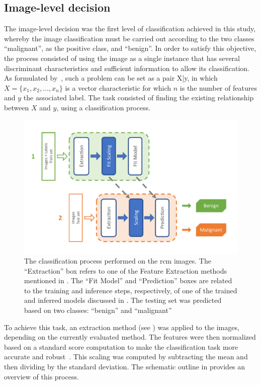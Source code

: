\documentclass[journal,article,accept,moreauthors,pdftex, applsci]{Definitions/mdpi}
\begin{document}
\subsection{Image-level decision}
\label{sec:image_decision}
The image-level decision was the first level of classification achieved in this study, whereby the image classification must be carried out according to the two classes “malignant”, as the positive class, and “benign”. In order to satisfy this objective, the process consisted of using the image as a single instance that has several discriminant characteristics and sufficient information to allow its classification. As formulated by~\cite{foulds_frank_2010}, such a problem can be set as a pair {X|y}, in which \(X=\{x_1,x_2,\ldots,x_n\}\) is a vector characteristic for which \(n\) is the number of features and \(y\) the associated label. The task consisted of finding the existing relationship between \(X\) and \(y\), using a classification process.\par 
\begin{figure}[H]
    \begin{center}
        \includegraphics[width=0.7\linewidth]{Figures/Process_Image.pdf}
        \caption{The classification process performed on the \ac{rcm} images. The “Extraction” box refers to one of the Feature Extraction methods mentioned in . The “Fit Model” and “Prediction” boxes are related to the training and inference steps, respectively, of one of the trained and inferred models discussed in . The testing set was predicted based on two classes: “benign” and “malignant”}
        \label{fig:image_process}
    \end{center} 
\end{figure}\par
To achieve this task, an extraction method (see ) was applied to the images, depending on the currently evaluated method. The features were then normalized based on a standard score computation to make the classification task more accurate and robust~\cite{Graf2001}. This scaling was computed by subtracting the mean and then dividing by the standard deviation. The schematic outline in  provides an overview of this process.\par
\end{document}
